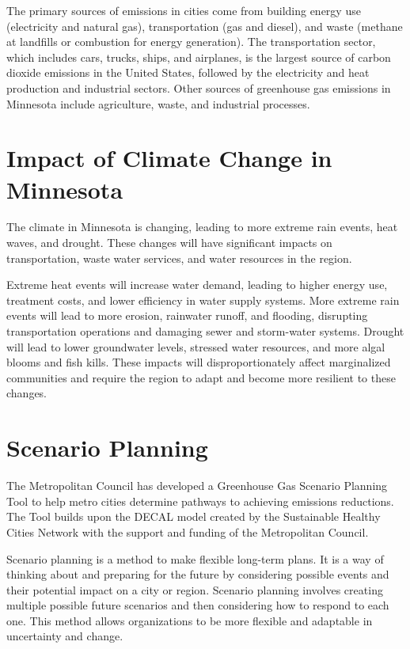 \documentclass[
]{book}
\begin{document}
The primary sources of emissions in cities come from building energy use (electricity and natural gas), transportation (gas and diesel), and waste (methane at landfills or combustion for energy generation). The transportation sector, which includes cars, trucks, ships, and airplanes, is the largest source of carbon dioxide emissions in the United States, followed by the electricity and heat production and industrial sectors. Other sources of greenhouse gas emissions in Minnesota include agriculture, waste, and industrial processes.

\hypertarget{impact-of-climate-change-in-minnesota}{%
\section{Impact of Climate Change in Minnesota}\label{impact-of-climate-change-in-minnesota}}

The climate in Minnesota is changing, leading to more extreme rain events, heat waves, and drought. These changes will have significant impacts on transportation, waste water services, and water resources in the region.

Extreme heat events will increase water demand, leading to higher energy use, treatment costs, and lower efficiency in water supply systems. More extreme rain events will lead to more erosion, rainwater runoff, and flooding, disrupting transportation operations and damaging sewer and storm-water systems. Drought will lead to lower groundwater levels, stressed water resources, and more algal blooms and fish kills. These impacts will disproportionately affect marginalized communities and require the region to adapt and become more resilient to these changes.

\hypertarget{scenario-planning}{%
\section{Scenario Planning}\label{scenario-planning}}

The Metropolitan Council has developed a Greenhouse Gas Scenario Planning Tool to help metro cities determine pathways to achieving emissions reductions. The Tool builds upon the DECAL model created by the Sustainable Healthy Cities Network with the support and funding of the Metropolitan Council.

Scenario planning is a method to make flexible long-term plans. It is a way of thinking about and preparing for the future by considering possible events and their potential impact on a city or region. Scenario planning involves creating multiple possible future scenarios and then considering how to respond to each one. This method allows organizations to be more flexible and adaptable in uncertainty and change.
\end{document}
